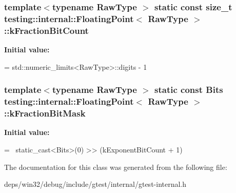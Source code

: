 \subsubsection[{k\+Fraction\+Bit\+Count}]{\setlength{\rightskip}{0pt plus 5cm}template$<$typename Raw\+Type $>$ static const size\+\_\+t {\bf testing\+::internal\+::\+Floating\+Point}$<$ Raw\+Type $>$\+::k\+Fraction\+Bit\+Count\hspace{0.3cm}{\ttfamily [static]}}\label{classtesting_1_1internal_1_1_floating_point_a2d98c93a74099d1a422e8fa34761d354}
{\bfseries Initial value\+:}
\begin{DoxyCode}
=
    std::numeric\_limits<RawType>::digits - 1
\end{DoxyCode}
\hypertarget{classtesting_1_1internal_1_1_floating_point_a2f3ae7ced0ef045915fa8d1c6148ab13}{}
\subsubsection[{k\+Fraction\+Bit\+Mask}]{\setlength{\rightskip}{0pt plus 5cm}template$<$typename Raw\+Type $>$ static const Bits {\bf testing\+::internal\+::\+Floating\+Point}$<$ Raw\+Type $>$\+::k\+Fraction\+Bit\+Mask\hspace{0.3cm}{\ttfamily [static]}}\label{classtesting_1_1internal_1_1_floating_point_a2f3ae7ced0ef045915fa8d1c6148ab13}
{\bfseries Initial value\+:}
\begin{DoxyCode}
=
    ~static\_cast<Bits>(0) >> (kExponentBitCount + 1)
\end{DoxyCode}


The documentation for this class was generated from the following file\+:\begin{DoxyCompactItemize}
\item 
deps/win32/debug/include/gtest/internal/gtest-\/internal.\+h\end{DoxyCompactItemize}
